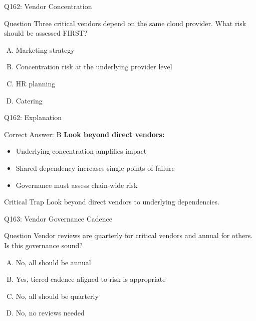 \documentclass{beamer}
\begin{document}
	\begin{frame}{Q162: Vendor Concentration}
		\begin{block}{Question}
			Three critical vendors depend on the same cloud provider. What risk should be assessed FIRST?
		\end{block}
		\begin{enumerate}[(A)]
			\item Marketing strategy
			\item Concentration risk at the underlying provider level
			\item HR planning
			\item Catering
		\end{enumerate}
	\end{frame}
	
	\begin{frame}{Q162: Explanation}
		\begin{block}{Correct Answer: B}
			\textbf{Look beyond direct vendors:}
			\begin{itemize}
				\item Underlying concentration amplifies impact
				\item Shared dependency increases single points of failure
				\item Governance must assess chain-wide risk
			\end{itemize}
		\end{block}
		\begin{alertblock}{Critical Trap}
			Look beyond direct vendors to underlying dependencies.
		\end{alertblock}
	\end{frame}
	
	\begin{frame}{Q163: Vendor Governance Cadence}
		\begin{block}{Question}
			Vendor reviews are quarterly for critical vendors and annual for others. Is this governance sound?
		\end{block}
		\begin{enumerate}[(A)]
			\item No, all should be annual
			\item Yes, tiered cadence aligned to risk is appropriate
			\item No, all should be quarterly
			\item No, no reviews needed
		\end{enumerate}
	\end{frame}
	
\end{document}
